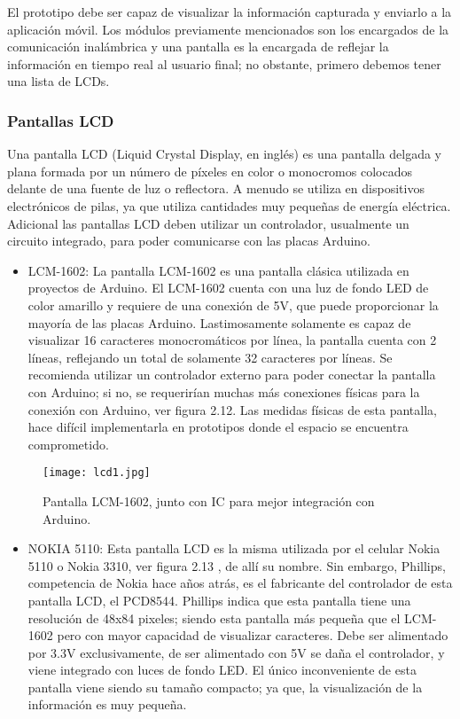 \par \noindent
El prototipo debe ser capaz de visualizar la información capturada y enviarlo a la aplicación móvil. 
Los módulos previamente mencionados son los encargados de la comunicación inalámbrica y una pantalla es la encargada de reflejar la información en tiempo real al usuario final; no obstante, primero debemos tener una lista de LCDs.

\subsubsection{Pantallas LCD}

Una pantalla LCD (Liquid Crystal Display, en inglés) es una pantalla delgada y plana formada por un número de píxeles en color o monocromos colocados delante de una fuente de luz o reflectora. A menudo se utiliza en dispositivos electrónicos de pilas, ya que utiliza cantidades muy pequeñas de energía eléctrica\cite{lcd}. Adicional las pantallas LCD deben utilizar un controlador, usualmente un circuito integrado, para poder comunicarse con las placas Arduino. 

\begin{itemize}
	\item LCM-1602: La pantalla LCM-1602 es una pantalla clásica utilizada en proyectos de Arduino. El LCM-1602 cuenta con una luz de fondo LED de color amarillo y requiere de una conexión de 5V, que puede proporcionar la mayoría de las placas Arduino. Lastimosamente solamente es capaz de visualizar 16 caracteres monocromáticos por línea, la pantalla cuenta con 2 líneas, reflejando un total de solamente 32 caracteres por líneas\cite{lcm}. Se recomienda utilizar un controlador externo para poder conectar la pantalla con Arduino; si no, se requerirían muchas más conexiones físicas para la conexión con Arduino, ver figura 2.12. Las medidas físicas de esta pantalla, hace difícil implementarla en prototipos donde el espacio se encuentra comprometido.
\end{itemize}

\begin{figure}[H]
	\centering
	\texttt{[image: lcd1.jpg]}
	\caption{Pantalla LCM-1602, junto con IC para mejor integración con Arduino.}
\end{figure}

\begin{itemize}
	\item NOKIA 5110: Esta pantalla LCD es la misma utilizada por el celular Nokia 5110 o Nokia 3310, ver figura 2.13 , de allí su nombre\cite{nokia1}. 
	Sin embargo, Phillips, competencia de Nokia hace años atrás, es el fabricante del controlador de esta pantalla LCD, el PCD8544. Phillips indica que esta pantalla tiene una resolución de 48x84 pixeles; siendo esta pantalla más pequeña que el LCM-1602 pero con mayor capacidad de visualizar caracteres\cite{nokia2}. Debe ser alimentado por 3.3V exclusivamente, de ser alimentado con 5V se daña el controlador, y viene integrado con luces de fondo LED\cite{nokia2}. El único inconveniente de esta pantalla viene siendo su tamaño compacto; ya que, la visualización de la información es muy pequeña.
\end{itemize}

